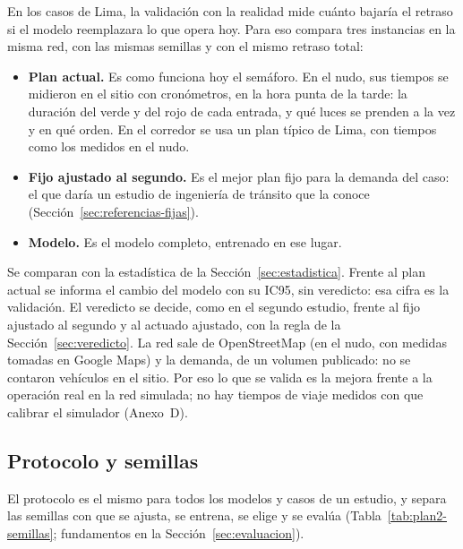 En los casos de Lima, la validación con la realidad mide cuánto bajaría
el retraso si el modelo reemplazara lo que opera hoy. Para eso compara
tres instancias en la misma red, con las mismas semillas y con el mismo
retraso total:
\begin{itemize}
  \item \textbf{Plan actual.} Es como funciona hoy el semáforo. En el
    nudo, sus tiempos se midieron en el sitio con cronómetros, en la hora
    punta de la tarde: la duración del verde y del rojo de cada entrada,
    y qué luces se prenden a la vez y en qué orden. En el corredor se usa
    un plan típico de Lima, con tiempos como los medidos en el nudo.
  \item \textbf{Fijo ajustado al segundo.} Es el mejor plan fijo para la
    demanda del caso: el que daría un estudio de ingeniería de tránsito
    que la conoce (Sección~\ref{sec:referencias-fijas}).
  \item \textbf{Modelo.} Es el modelo completo, entrenado en ese lugar.
\end{itemize}
Se comparan con la estadística de la Sección~\ref{sec:estadistica}.
Frente al plan actual se informa el cambio del modelo con su IC95, sin
veredicto: esa cifra es la validación. El veredicto se decide, como en el segundo estudio, frente
al fijo ajustado al segundo y al actuado ajustado, con la regla de la
Sección~\ref{sec:veredicto}. La red sale de OpenStreetMap (en el nudo,
con medidas tomadas en Google Maps) y la demanda, de un volumen
publicado: no se contaron vehículos en el sitio. Por eso lo que se
valida es la mejora frente a la operación real en la red simulada; no
hay tiempos de viaje medidos con que calibrar el simulador (Anexo~D).

\subsection{Protocolo y semillas}
\label{sec:protocolo}

El protocolo es el mismo para todos los modelos y casos de un estudio,
y separa las semillas con que se ajusta, se entrena, se elige y se
evalúa (Tabla~\ref{tab:plan2-semillas}; fundamentos en la
Sección~\ref{sec:evaluacion}).

